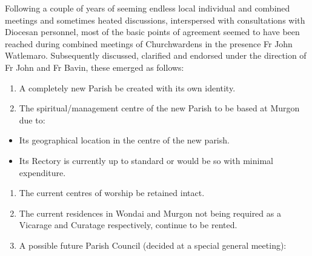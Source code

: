 Following a couple of years of seeming endless local individual and combined meetings and sometimes heated discussions, interspersed with consultations with Diocesan personnel, most of the basic points of agreement seemed to have been reached during combined meetings of Churchwardens in the presence Fr John Watlemaro. Subsequently discussed, clarified and endorsed under the direction of Fr John and Fr Bavin, these emerged as follows:



\begin{enumerate}

\def\labelenumi{\arabic{enumi}.}

\item

  A completely new Parish be created with its own identity.

\item

  The spiritual/management centre of the new Parish to be based at Murgon due to:

\end{enumerate}



\begin{itemize}

\item

  Its geographical location in the centre of the new parish.

\item

  Its Rectory is currently up to standard or would be so with minimal expenditure.

\end{itemize}



\begin{enumerate}

\def\labelenumi{\arabic{enumi}.}

\setcounter{enumi}{2}

\item

  The current centres of worship be retained intact.

\item

  The current residences in Wondai and Murgon not being required as a Vicarage and Curatage respectively, continue to be rented.

\item

  A possible future Parish Council (decided at a special general meeting):

\end{enumerate}



